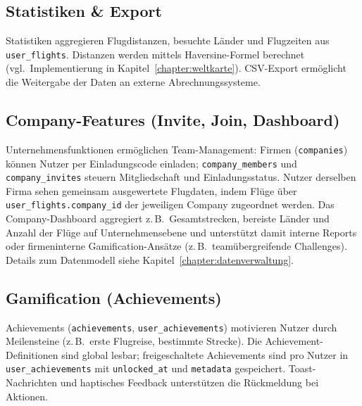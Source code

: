 \subsection{Statistiken \& Export}
Statistiken aggregieren Flugdistanzen, besuchte Länder und Flugzeiten aus
\texttt{user\_flights}. Distanzen werden mittels Haversine-Formel berechnet
(vgl.\ Implementierung in Kapitel~\ref{chapter:weltkarte}). CSV-Export
ermöglicht die Weitergabe der Daten an externe Abrechnungssysteme.

\subsection{Company-Features (Invite, Join, Dashboard)}
Unternehmensfunktionen ermöglichen Team-Management: Firmen (\texttt{companies})
können Nutzer per Einladungscode einladen; \texttt{company\_members} und
\texttt{company\_invites} steuern Mitgliedschaft und Einladungsstatus. Nutzer
derselben Firma sehen gemeinsam ausgewertete Flugdaten, indem Flüge über
\texttt{user\_flights.company\_id} der jeweiligen Company zugeordnet werden.
Das Company-Dashboard aggregiert z.\,B.\ Gesamtstrecken, bereiste Länder und
Anzahl der Flüge auf Unternehmensebene und unterstützt damit interne Reports
oder firmeninterne Gamification-Ansätze (z.\,B.\ teamübergreifende Challenges).
Details zum Datenmodell siehe Kapitel~\ref{chapter:datenverwaltung}.

\subsection{Gamification (Achievements)}
Achievements (\texttt{achievements}, \texttt{user\_achievements}) motivieren
Nutzer durch Meilensteine (z.\,B.\ erste Flugreise, bestimmte Strecke). Die
Achievement-Definitionen sind global lesbar; freigeschaltete Achievements sind
pro Nutzer in \texttt{user\_achievements} mit \texttt{unlocked\_at} und
\texttt{metadata} gespeichert. Toast-Nachrichten und haptisches Feedback
unterstützen die Rückmeldung bei Aktionen.
